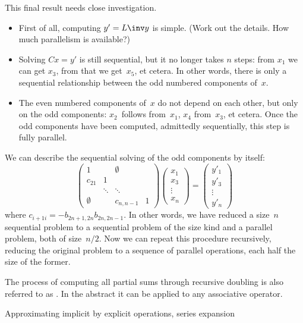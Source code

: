 This final result needs close investigation.
\begin{itemize}
\item First of all, computing $y'=L\inv y$ is simple. (Work out the
  details. How much parallelism is available?)
\item Solving $Cx=y'$ is still sequential, but it no longer takes $n$
  steps: from $x_1$ we can get $x_3$, from that we get~$x_5$, et
  cetera. In other words, there is only a sequential relationship
  between the odd numbered components of~$x$.
\item The even numbered components of~$x$ do not depend on each other,
  but only on the odd components: $x_2$~follows from~$x_1$, $x_4$
  from~$x_3$, et cetera. Once the odd components have been computed,
  admittedly sequentially, this step is fully parallel.
\end{itemize}
We can describe the sequential solving of the odd components by
itself:
\[ 
  \begin{pmatrix}
    1&&\emptyset\\ c_{21}&1\\ &\ddots&\ddots\\ 
    \emptyset&&c_{n,n-1}&1
  \end{pmatrix}
  \begin{pmatrix}
    x_1\\ x_3\\ \vdots\\ x_n
  \end{pmatrix} = 
  \begin{pmatrix}
    y'_1\\ y'_3\\ \vdots\\ y'_n
  \end{pmatrix}
\]
where $c_{i+1i}=-b_{2n+1,2n}b_{2n,2n-1}$. In other words, we have
reduced a size~$n$ sequential problem to a sequential problem of the
size kind and a parallel problem, both of size~$n/2$. Now we can
repeat this procedure recursively, reducing the original problem to a
sequence of parallel operations, each half the size of the former.

The process of computing all partial sums through recursive doubling
is also referred to as . In the abstract it
can be applied to any associative operator.


 {Approximating implicit by explicit operations, series expansion}
\label{sec:implicit-becomes-explicit}

